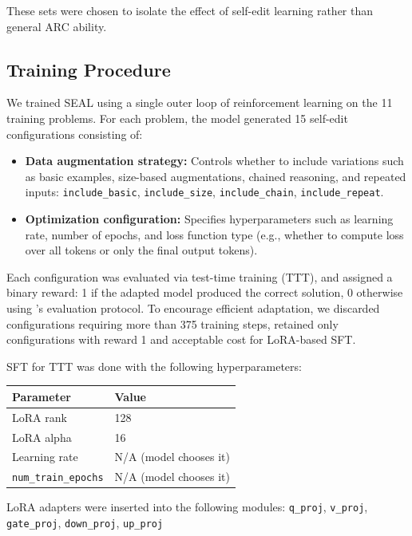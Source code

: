 \documentclass{article}
\newcommand{\methodacronym}{SEAL\xspace}
\begin{document}
These sets were chosen to isolate the effect of self-edit learning rather than general ARC ability.

\subsection{Training Procedure}

We trained \methodacronym{} using a single outer loop of reinforcement learning on the 11 training problems. For each problem, the model generated 15 self-edit configurations consisting of:
\begin{itemize}
    \item \textbf{Data augmentation strategy:} Controls whether to include variations such as basic examples, size-based augmentations, chained reasoning, and repeated inputs:
    \texttt{include\_basic}, \texttt{include\_size}, \texttt{include\_chain}, \texttt{include\_repeat}.
    
    \item \textbf{Optimization configuration:} Specifies hyperparameters such as learning rate, number of epochs, and loss function type (e.g., whether to compute loss over all tokens or only the final output tokens).
\end{itemize}

Each configuration was evaluated via test-time training (TTT), and assigned a binary reward: 1 if the adapted model produced the correct solution, 0 otherwise using \citet{akyurek2025TTT}'s evaluation protocol. To encourage efficient adaptation, we discarded configurations requiring more than 375 training steps, retained only configurations with reward 1 and acceptable cost for LoRA-based SFT.

SFT for TTT was done with the following hyperparameters:
\begin{center}
\begin{tabular}{|l|l|}
\hline
\textbf{Parameter} & \textbf{Value} \\
\hline
LoRA rank & 128 \\
LoRA alpha & 16 \\
Learning rate & N/A (model chooses it) \\
\texttt{num\_train\_epochs} & N/A (model chooses it) \\

\hline
\end{tabular}
\end{center}

LoRA adapters were inserted into the following modules: \texttt{q\_proj}, \texttt{v\_proj}, \texttt{gate\_proj}, \texttt{down\_proj}, \texttt{up\_proj}
\end{document}
